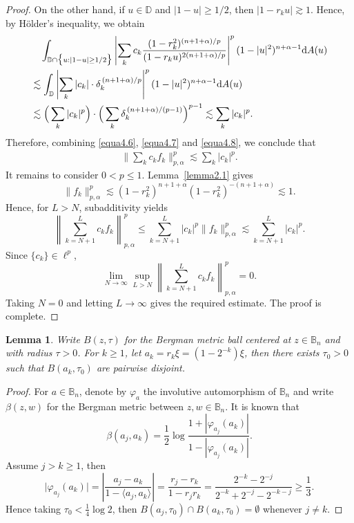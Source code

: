 \documentclass[preprint,12pt,times]{elsarticle}
\newtheorem{lemma}[theorem]{Lemma}
\theoremstyle{definition}
\theoremstyle{remark}
\numberwithin{equation}{section}
\begin{document}
\begin{proof}
On the other hand, if $u\in\mathbb{D}$ and $|1-u|\geq 1/2$, then $|1-r_k u|\gtrsim 1$. Hence, by H\"older's inequality, we obtain
\begin{equation}\label{equa4.8}
\begin{split}
&\quad \int_{\mathbb{D}\cap\big\{u: |1-u|\geq 1/2\big\}}\left|\sum_{k}c_k\frac{(1-r_k^2)^{(n+1+\alpha)/p}}{(1-r_ku)^{2(n+1+\alpha)/p}}\right|^p(1-|u|^2)^{n+\alpha-1}{\rm d}A(u)\\
&\lesssim \int_{\mathbb{D}}\left|\sum_{k}|c_k|\cdot \delta_k^{\,(n+1+\alpha)/p}\right|^p(1-|u|^2)^{n+\alpha-1}{\rm d}A(u)\\
&\lesssim \Big(\sum_{k}|c_k|^p\Big)\cdot \Big(\sum_{k}\delta_k^{\,(n+1+\alpha)/(p-1)}\Big)^{p-1}\lesssim \sum_{k}|c_k|^p.
\end{split}
\end{equation}
Therefore, combining \eqref{equa4.6}, \eqref{equa4.7} and \eqref{equa4.8}, we conclude that
\begin{align*}
\big\|\sum_{k}c_kf_k\big\|_{p,\alpha}^p\lesssim \sum_{k}|c_k|^p.
\end{align*}
 It remains to consider $0<p\leq1$. Lemma~\ref{lemma2.1} gives
\[
  \|f_k\|_{p,\alpha}^p
  \lesssim (1-r_k^2)^{n+1+\alpha}
  (1-r_k^2)^{-(n+1+\alpha)}\lesssim1.
\]
Hence, for $L>N$, subadditivity yields
\[
  \left\|\sum_{k=N+1}^Lc_kf_k\right\|_{p,\alpha}^p
  \leq\sum_{k=N+1}^L|c_k|^p\|f_k\|_{p,\alpha}^p
  \lesssim\sum_{k=N+1}^L|c_k|^p.
\]
Since $\{c_k\}\in\ell^p$,
\[
  \lim_{N\to\infty}\sup_{L>N}
  \left\|\sum_{k=N+1}^Lc_kf_k\right\|_{p,\alpha}^p=0.
\]
Taking $N=0$ and letting $L\to\infty$ gives the required estimate.  The proof is complete.
\end{proof}

\begin{lemma}\label{lemma4.6}
Write $B(z,\tau)$ for the Bergman metric ball centered at $z\in\mathbb{B}_n$ and with radius $\tau>0$. For $k\geq 1$, let $a_k=r_k\xi=(1-2^{-k})\xi$, then there exists $\tau_0>0$ such that $B(a_k,\tau_0)$ are pairwise disjoint.
\end{lemma}

\begin{proof}
For $a\in\mathbb{B}_n$, denote by $\varphi_a$ the involutive automorphism of $\mathbb{B}_n$ and write $\beta(z,w)$ for the Bergman metric between $z,w\in\mathbb{B}_n$. It is known that 
\[
    \beta(a_j,a_k)=\frac{1}{2}\log\frac{1+|\varphi_{a_j}(a_k)|}{1-|\varphi_{a_j}(a_k)|}.
\]
Assume $j>k\geq 1$, then
\[
    \big|\varphi_{a_j}(a_k)\big|=\left|\frac{a_j-a_k}{1-\langle a_j,a_k\rangle}\right|=\frac{r_j-r_k}{1-r_jr_k}=\frac{2^{-k}-2^{-j}}{2^{-k}+2^{-j}-2^{-k-j}}\geq \frac{1}{3}.
\]
Hence taking $\tau_0<\frac{1}{4}\log 2$, then $B(a_j,\tau_0)\cap B(a_k,\tau_0)=\emptyset$ whenever $j\neq k$.
\end{proof}
\end{document}

